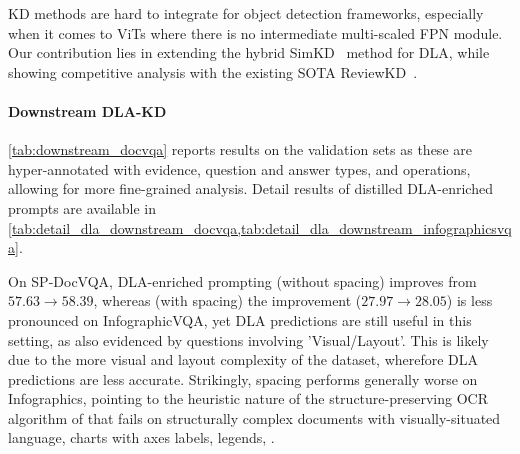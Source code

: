 \documentclass[runningheads]{llncs}
\begin{document}
KD methods are hard to integrate for object detection frameworks, especially when it comes to ViTs where there is no intermediate multi-scaled FPN module.
Our contribution lies in extending the hybrid SimKD~\cite{SimKD} method for DLA, while showing competitive analysis with the existing SOTA ReviewKD~\cite{chen2021distilling}.



\paragraph{Downstream DLA-KD} \cref{tab:downstream_docvqa} reports results on the validation sets as these are hyper-annotated with evidence, question and answer types, and operations, allowing for more fine-grained analysis.
Detail results of distilled DLA-enriched prompts are available in \cref{tab:detail_dla_downstream_docvqa,tab:detail_dla_downstream_infographicsvqa}.

On SP-DocVQA, DLA-enriched prompting (without spacing) improves from $57.63 \to 58.39$, whereas (with spacing) the improvement ($27.97 \to 28.05$) is less pronounced on InfographicVQA, yet  DLA predictions are still useful in this setting, as also evidenced by questions involving 'Visual/Layout'. This is likely due to the more visual and layout complexity of the dataset, wherefore DLA predictions are less accurate. Strikingly, spacing performs generally worse on Infographics, pointing to the heuristic nature of the structure-preserving OCR algorithm of \cite{wang2023layout} that fails on structurally complex documents with visually-situated language, charts with axes labels, legends, \etc.
\end{document}

